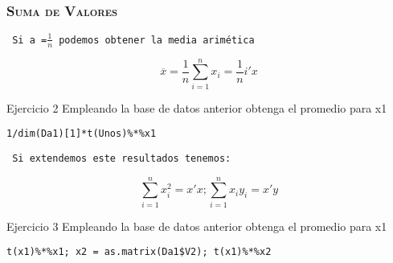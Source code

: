 \documentclass[16.5pt]{beamer}
\begin{document}


{
\begin{frame}
\frametitle{\textsc{\textbf{Suma de Valores}}}
\hspace*{-5mm}
\vspace*{-2mm} 
\vspace{0.3cm}

\texttt{{\color{blue} Si a =$\frac{1}{n}$ podemos obtener la media arimética}}
\begin{tiny}
\[ \overline{x} = \frac{1}{n}\sum_{i=1}^n  x_i =\frac{1}{n}i'x \]
\end{tiny}

\begin{bclogo}{Ejercicio 2}
 {\tiny\color{blue} Empleando la base de datos anterior obtenga el promedio para x1}
\begin{lstlisting}[basicstyle=\tiny]
1/dim(Da1)[1]*t(Unos)%*%x1
\end{lstlisting}
\end{bclogo}


\texttt{  {\color{blue} Si extendemos este resultados tenemos:}}

\begin{tiny}
\[ \sum_{i=1}^n  x_i^2 = x'x; \sum_{i=1}^n  x_iy_i = x'y \]
\end{tiny}


\begin{bclogo}{Ejercicio 3}
 {\tiny\color{blue} Empleando la base de datos anterior obtenga el promedio para x1}
\begin{lstlisting}[basicstyle=\tiny]
t(x1)%*%x1; x2 = as.matrix(Da1$V2); t(x1)%*%x2
\end{lstlisting}
\end{bclogo}

\end{frame}
}
\end{document}

